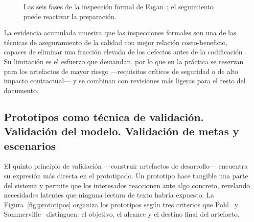 \documentclass[11pt,a4paper,oneside]{report}
\begin{document}
	\begin{figure}[htbp]
		\centering
		\caption{Las seis fases de la inspecci\'on formal de Fagan~\citep{fagan_1976}; el seguimiento puede reactivar la preparaci\'on.}
		\label{fig:fagan}
	\end{figure}
	
	La evidencia acumulada muestra que las inspecciones formales son una de las t\'ecnicas de aseguramiento de la calidad con mejor relaci\'on costo-beneficio, capaces de eliminar una fracci\'on elevada de los defectos antes de la codificaci\'on \citep{sommerville_2016}. Su limitaci\'on es el esfuerzo que demandan, por lo que en la pr\'actica se reservan para los artefactos de mayor riesgo ---requisitos cr\'iticos de seguridad o de alto impacto contractual--- y se combinan con revisiones m\'as ligeras para el resto del documento.
	
	\subsection{Prototipos como t\'ecnica de validaci\'on. Validaci\'on del modelo. Validaci\'on de metas y escenarios}
	
	El quinto principio de validaci\'on ---construir artefactos de desarrollo--- encuentra su expresi\'on m\'as directa en el prototipado. Un prototipo hace tangible una parte del sistema y permite que los interesados reaccionen ante algo concreto, revelando necesidades latentes que ninguna lectura de texto habr\'ia expuesto. La Figura~\ref{fig:prototipos} organiza los prototipos seg\'un tres criterios que Pohl~\citep{pohl_2010} y Sommerville~\citep{sommerville_2016} distinguen: el objetivo, el alcance y el destino final del artefacto.
	
\end{document}
